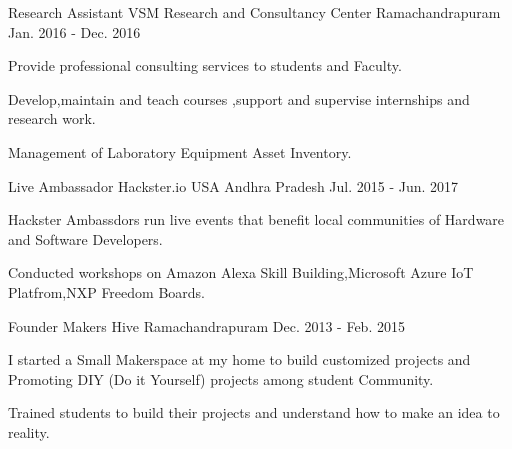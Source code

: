 \begin{cventries}
  \cventry
    {Research Assistant}
    {VSM Research and Consultancy Center}
    {Ramachandrapuram}
    {Jan. 2016 - Dec. 2016}
    {
      \begin{cvitems}
        \item {Provide professional consulting services to students and Faculty.}
	\item{Develop,maintain and teach courses ,support and supervise internships and research work.}
        \item {Management of Laboratory Equipment Asset Inventory.}
        \item{                                           }
      \end{cvitems} 
    }
  \cventry
    {Live Ambassador}
    {Hackster.io USA}
    {Andhra Pradesh}
    {Jul. 2015 - Jun. 2017}
    {
      \begin{cvitems}
        \item {Hackster Ambassdors run live events that benefit local communities of Hardware and Software Developers.}
	\item{Conducted workshops on Amazon Alexa Skill Building,Microsoft Azure IoT Platfrom,NXP Freedom Boards.}
	\item{                                           }
      \end{cvitems}
    }
  \cventry
    {Founder}
    {Makers Hive}
    {Ramachandrapuram}
    {Dec. 2013 - Feb. 2015}
    {
      \begin{cvitems}
        \item {I started a Small Makerspace at my home to build customized projects and Promoting DIY (Do it Yourself) projects among student Community. }
	\item{Trained students to build their projects and understand how to make an idea to reality.}
	\item{                                           }
      \end{cvitems}
    }
\end{cventries}
